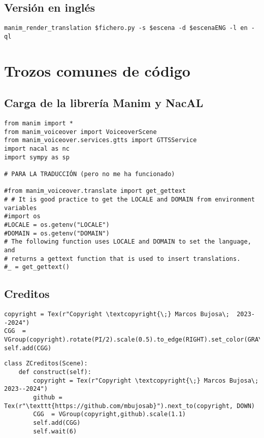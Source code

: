 \documentclass[11pt]{article}
\begin{document}
\subsection{Versión en inglés}
\label{sec:orgeb1ea68}

\begin{verbatim}
manim_render_translation $fichero.py -s $escena -d $escenaENG -l en -ql
\end{verbatim}


\section{Trozos comunes de código}
\label{sec:orgc0c1570}


\subsection{Carga de la librería Manim y NacAL}
\label{sec:orgd5df353}

\begin{verbatim}
from manim import *
from manim_voiceover import VoiceoverScene
from manim_voiceover.services.gtts import GTTSService
import nacal as nc
import sympy as sp

# PARA LA TRADUCCIÓN (pero no me ha funcionado)

#from manim_voiceover.translate import get_gettext
# # It is good practice to get the LOCALE and DOMAIN from environment variables
#import os
#LOCALE = os.getenv("LOCALE")
#DOMAIN = os.getenv("DOMAIN")
# The following function uses LOCALE and DOMAIN to set the language, and
# returns a gettext function that is used to insert translations.
#_ = get_gettext()
\end{verbatim}


\subsection{Creditos}
\label{sec:orgbccfcd4}

\begin{verbatim}
copyright = Tex(r"Copyright \textcopyright{\;} Marcos Bujosa\;  2023--2024")
CGG  = VGroup(copyright).rotate(PI/2).scale(0.5).to_edge(RIGHT).set_color(GRAY_D)
self.add(CGG)
\end{verbatim}


\begin{verbatim}
class ZCreditos(Scene):
    def construct(self):
        copyright = Tex(r"Copyright \textcopyright{\;} Marcos Bujosa\;  2023--2024")
        github = Tex(r"\texttt{https://github.com/mbujosab}").next_to(copyright, DOWN)
        CGG  = VGroup(copyright,github).scale(1.1)
        self.add(CGG)
        self.wait(6)
\end{verbatim}
\end{document}
